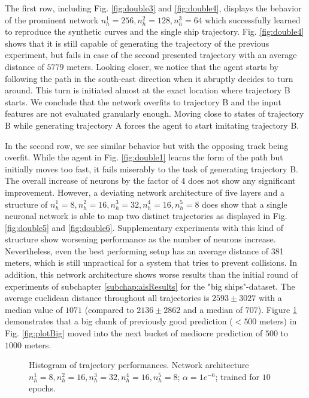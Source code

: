 The first row, including Fig. \ref{fig:double3} and \ref{fig:double4}, displays the behavior of the prominent network $n_h^1=256, n_h^2=128, n_h^3=64$ which successfully learned to reproduce the synthetic curves and the single ship trajectory. Fig. \ref{fig:double4} shows that it is still capable of generating the trajectory of the previous experiment, but fails in case of the second presented trajectory with an average distance of $5779$ meters. Looking closer, we notice that the agent starts by following the path in the south-east direction when it abruptly decides to turn around. This turn is initiated almost at the exact location where trajectory B starts. We conclude that the network overfits to trajectory B and the input features are not evaluated granularly enough. Moving close to states of trajectory B while generating trajectory A forces the agent to start imitating trajectory B.
\par
In the second row, we see similar behavior but with the opposing track being overfit. While the agent in Fig. \ref{fig:double1} learns the form of the path but initially moves too fast, it fails miserably to the task of generating trajectory B. The overall increase of neurons by the factor of $4$ does not show any significant improvement. However, a deviating network architecture of five layers and a structure of $n_h^1=8, n_h^2=16, n_h^3=32, n_h^4=16, n_h^5=8$ does show that a single neuronal network is able to map two distinct trajectories as displayed in Fig. \ref{fig:double5} and \ref{fig:double6}. Supplementary experiments with this kind of structure show worsening performance as the number of neurons increase. Nevertheless, even the best performing setup has an average distance of 381 meters, which is still unpractical for a system that tries to prevent collisions. In addition, this network architecture shows worse results than the initial round of experiments of subchapter \ref{subchap:aisResults} for the "big ships"-dataset. The average euclidean distance throughout all trajectories is $2593 \pm 3027$ with a median value of $1071$ (compared to $2136 \pm 2862$ and a median of $707$). Figure \ref{fig:finalBarPlot} demonstrates that a big chunk of previously good prediction ($<500$ meters) in Fig. \ref{fig:plotBig} moved into the next bucket of mediocre prediction of $500$ to $1000$ meters. 
\begin{figure}[H]
    \centering
    
    \caption{Histogram of trajectory performances. Network architecture $n_h^1=8, n_h^2=16, n_h^3=32, n_h^4=16, n_h^5=8$; $\alpha=1e^{-6}$; trained for $10$ epochs.}
    \label{fig:finalBarPlot}
\end{figure}

